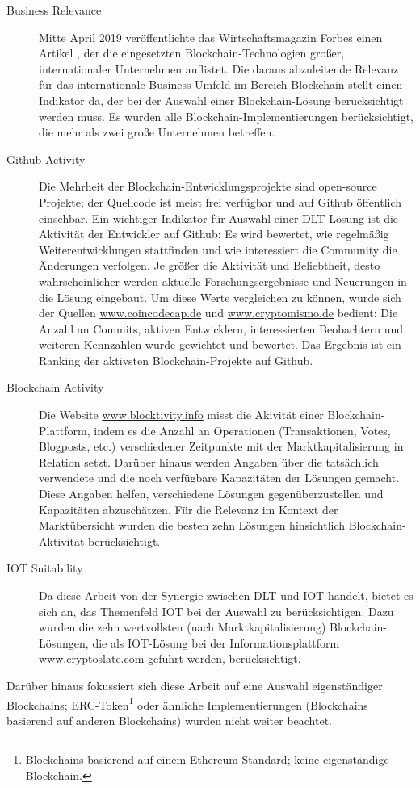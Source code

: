 \begin{description}
  \item[Business Relevance] Mitte April 2019 veröffentlichte das Wirtschaftsmagazin Forbes einen Artikel \cite{castillo2019}, der die eingesetzten Blockchain-Technologien großer, internationaler Unternehmen auflistet. Die daraus abzuleitende Relevanz für das internationale Business-Umfeld im Bereich Blockchain stellt einen Indikator da, der bei der Auswahl einer Blockchain-Lösung berücksichtigt werden muss. Es wurden alle Blockchain-Implementierungen berücksichtigt, die mehr als zwei große Unternehmen betreffen.
  \item[Github Activity] Die Mehrheit der Blockchain-Entwicklungsprojekte sind open-source Projekte; der Quellcode ist meist frei verfügbar und auf Github öffentlich einsehbar. Ein wichtiger Indikator für Auswahl einer \ac{DLT}-Lösung ist die Aktivität der Entwickler auf Github: Es wird bewertet, wie regelmäßig Weiterentwicklungen stattfinden und wie interessiert die Community die Änderungen verfolgen. Je größer die Aktivität und Beliebtheit, desto wahrscheinlicher werden aktuelle Forschungsergebnisse und Neuerungen in die Lösung eingebaut. Um diese Werte vergleichen zu können, wurde sich der Quellen \url{www.coincodecap.de} und \url{www.cryptomismo.de} bedient: Die Anzahl an Commits, aktiven Entwicklern, interessierten Beobachtern und weiteren Kennzahlen wurde gewichtet und bewertet. Das Ergebnis ist ein Ranking der aktivsten Blockchain-Projekte auf Github.
  \item[Blockchain Activity] Die Website \url{www.blocktivity.info} misst die Akivität einer Blockchain-Plattform, indem es die Anzahl an Operationen (Transaktionen, Votes, Blogposts, etc.) verschiedener Zeitpunkte mit der Marktkapitalisierung in Relation setzt. Darüber hinaus werden Angaben über die tatsächlich verwendete und die noch verfügbare Kapazitäten der Lösungen gemacht. Diese Angaben helfen, verschiedene Lösungen gegenüberzustellen und Kapazitäten abzuschätzen. Für die Relevanz im Kontext der Marktübersicht wurden die besten zehn Lösungen hinsichtlich Blockchain-Aktivität berücksichtigt.
  \item[IOT Suitability] Da diese Arbeit von der Synergie zwischen \ac{DLT} und \ac{IOT} handelt, bietet es sich an, das Themenfeld \ac{IOT} bei der Auswahl zu berücksichtigen. Dazu wurden die zehn wertvollsten (nach Marktkapitalisierung) Blockchain-Lösungen, die als \ac{IOT}-Lösung bei der Informationsplattform \url{www.cryptoslate.com} geführt werden, berücksichtigt.
\end{description}
Darüber hinaus fokussiert sich diese Arbeit auf eine Auswahl eigenständiger Blockchains; ERC-Token\footnote{Blockchains basierend auf einem Ethereum-Standard; keine eigenständige Blockchain.} oder ähnliche Implementierungen (Blockchains basierend auf anderen Blockchains) wurden nicht weiter beachtet.

